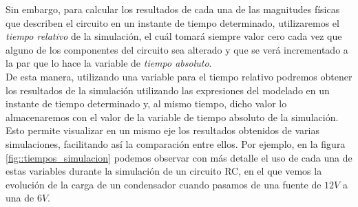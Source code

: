 \documentclass[../main.tex]{subfiles}
\begin{document}
Sin embargo, para calcular los resultados de cada una de las magnitudes físicas que describen el circuito en un instante de tiempo determinado, utilizaremos el \textit{tiempo relativo} de la simulación, el cuál tomará siempre valor cero cada vez que alguno de los componentes del circuito sea alterado y que se verá incrementado a la par que lo hace la variable de \textit{tiempo absoluto}.\\

De esta manera, utilizando una variable para el tiempo relativo podremos obtener los resultados de la simulación utilizando las expresiones del modelado en un instante de tiempo determinado y, al mismo tiempo, dicho valor lo almacenaremos con el valor de la variable de tiempo absoluto de la simulación. Esto permite visualizar en un mismo eje los resultados obtenidos de varias simulaciones, facilitando así la comparación entre ellos. Por ejemplo, en la figura \ref{fig::tiempos_simulacion} podemos observar con más detalle el uso de cada una de estas variables durante la simulación de un circuito RC, en el que vemos la evolución de la carga de un condensador cuando pasamos de una fuente de $12V$ a una de $6V$.
\end{document}
